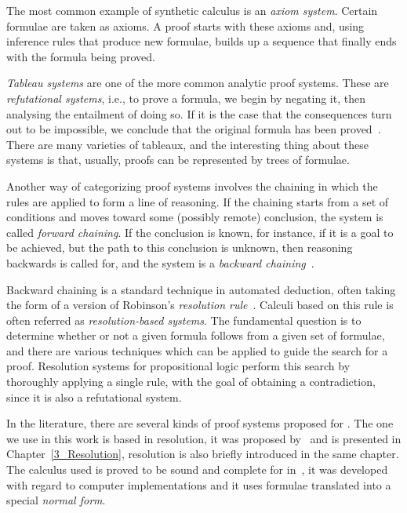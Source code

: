 The most common example of synthetic calculus is an \emph{axiom system}. Certain
formulae are taken as axioms. A proof starts with these axioms and, using
inference rules that produce new formulae, builds up a sequence that finally
ends with the formula being proved.

\emph{Tableau systems} are one of the more common analytic proof systems.
These are \emph{refutational systems}, i.e., to prove a formula, we begin by
negating it, then analysing the entailment of doing so. If it is the case that
the consequences turn out to be impossible, we conclude that the original
formula has been proved~\cite{fitting}. There are many varieties of tableaux,
and the interesting thing about these systems is that, usually, proofs can be
represented by trees of formulae.

Another way of categorizing proof systems involves the chaining in which the
rules are applied to form a line of reasoning. If the chaining starts from a set
of conditions and moves toward some (possibly remote) conclusion, the system is
called \emph{forward chaining}. If the conclusion is known, for instance, if it
is a goal to be achieved, but the path to this conclusion is unknown, then
reasoning backwards is called for, and the system is a \emph{backward
chaining}~\cite{feigenbaum1988rise}. 

Backward chaining is a standard technique in automated deduction, often taking
the form of a version of Robinson's \emph{resolution
rule}~\cite{harland2000forward}. Calculi based on this rule is often referred
as \emph{resolution-based systems}. The fundamental question is to determine
whether or not a given formula follows from a given set of formulae, and there
are various techniques which can be applied to guide the search for a proof.
Resolution systems for propositional logic perform this search by thoroughly
applying a single rule, with the goal of obtaining a contradiction, since it is
also a refutational system.

In the literature, there are several kinds of proof systems proposed for
. The one we use in this work is based in resolution, it was
proposed by~\cite{nalon2015modal} and is presented in
Chapter~\ref{3_Resolution}, resolution is also briefly introduced in the same
chapter. The calculus used is proved to be sound and complete for
 in~\cite{nalon2015modal}, it was developed with regard to
computer implementations and it uses formulae translated into a special
\emph{normal form}.

